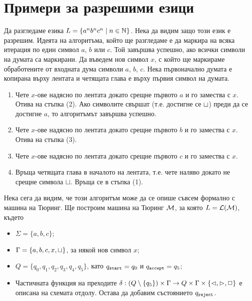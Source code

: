 \section{Примери за разрешими езици}
\label{sect:turing:examples}

\begin{extra}
\begin{example}
  Да разгледаме езика $L = \{a^nb^nc^n \mid n\in\mathbb{N}\}$.
  Нека да видим защо този език е разрешим.
  Идеята на алгоритъма, който ще разгледаме е да маркира на всяка итерация по един символ $a$, $b$ или $c$.
  Той завършва успешно, ако всички символи на думата са маркирани.
  Да въведем нов символ $x$, с който ще маркираме обработените от входната дума символи $a$, $b$, $c$.
  Нека първоначално думата е копирана върху лентата и четящата глава е върху първия символ на думата.
  \begin{enumerate}[(1)]
  \item 
    Чете $x$-ове надясно по лентата докато срещне първото $a$ и го замества с $x$. Отива на стъпка (2).
    Ако символите свършат (т.е. достигне се $\sqcup$) преди да се достигне $a$,
    то алгоритъмът завършва успешно.
  \item
    Чете $x$-ове надясно по лентата докато срещне първото $b$ и го замества с $x$.
    Отива на стъпка (3).
  \item
    Чете $x$-ове надясно по лентата докато срещне първото $c$ и го замества с $x$.
  \item
    Връща четящата глава в началото на лентата, т.е. чете наляво докато не срещне символа $\sqcup$.
    Връща се в стъпка (1). 
  \end{enumerate}

  Нека сега да видим, че този алгоритъм може да се опише съвсем формално с машина на Тюринг.
  Ще построим машина на Тюринг $\mathcal{M}$, за която $L = \mathcal{L}(\mathcal{M})$, където
  \begin{itemize}
  \item 
    $\Sigma = \{a,b,c\}$;
  \item
    $\Gamma = \{a,b,c,x,\sqcup\}$, за някой нов символ $x$;
  \item
    $Q = \{q_0,q_1,q_2,q_3,q_4,q_5\}$, като $q_{\texttt{start}} = q_0$ и $q_{\texttt{accept}} = q_5$;
  \item
    Частичната функция на преходите $\delta:(Q\setminus\{q_5\})\times\Gamma \to Q\times\Gamma\times\{\lhd,\rhd,\Box\}$
    е описана на схемата отдолу. Остава да добавим състоянието $q_{\texttt{reject}}$.
  \end{itemize}


\end{example}
\end{extra}
